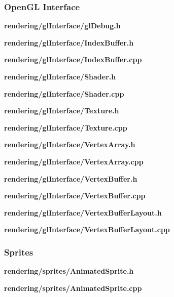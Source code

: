 \documentclass[../Main.tex]{subfiles}
\begin{document}
        \subsubsection{OpenGL Interface}
            \textbf{rendering/glInterface/glDebug.h}
            

            \textbf{rendering/glInterface/IndexBuffer.h}
            
            \textbf{rendering/glInterface/IndexBuffer.cpp}
            

            \textbf{rendering/glInterface/Shader.h}
            
            \textbf{rendering/glInterface/Shader.cpp}
            

            \textbf{rendering/glInterface/Texture.h}
            
            \textbf{rendering/glInterface/Texture.cpp}
            

            \textbf{rendering/glInterface/VertexArray.h}
            
            \textbf{rendering/glInterface/VertexArray.cpp}
            

            \textbf{rendering/glInterface/VertexBuffer.h}
            
            \textbf{rendering/glInterface/VertexBuffer.cpp}
            

            \textbf{rendering/glInterface/VertexBufferLayout.h}
            
            \textbf{rendering/glInterface/VertexBufferLayout.cpp}
            
        \subsubsection{Sprites}
            \textbf{rendering/sprites/AnimatedSprite.h}
            
            \textbf{rendering/sprites/AnimatedSprite.cpp}
            
\end{document}
